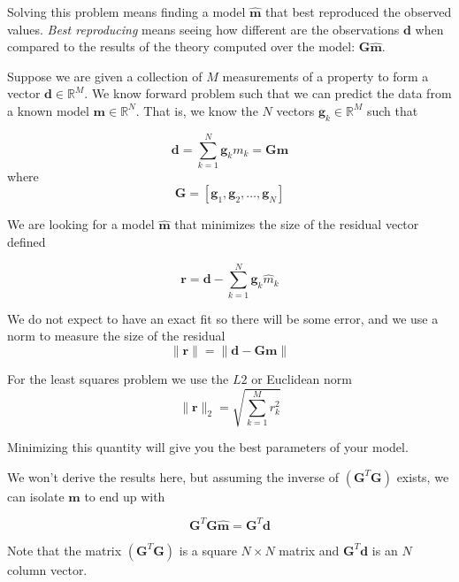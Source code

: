 \documentclass{article}
\newcommand{\real}{\mathbb{R}}
\begin{document}
Solving this problem means finding a model $\mathbf{\hat{m}}$ that
best reproduced the observed values. \emph{Best reproducing} means
seeing how different are the observations $\mathbf{d}$ when compared
to the results of the theory computed over the model: $\mathbf{G}
\mathbf{\hat{m}}$. 

Suppose we are given a collection of $M$ measurements of a property to
form a vector $\mathbf{d} \in \real^M$. We know forward problem such
that we can predict the data from a known model $\mathbf{m} \in
\real^N$. That is, we know the $N$ vectors $\mathbf{g}_k \in \real^M$
such that   

\begin{equation}
\mathbf{d} = \sum_{k=1}^{N} \mathbf{g}_k m_k = \mathbf{G} \mathbf{m}
\end{equation}
where
\begin{equation}
\mathbf{G} = \left[ \mathbf{g}_1, \mathbf{g}_2, \dots, \mathbf{g}_N \right] 
\end{equation}

We are looking for a model $\hat{\mathbf{m}}$ that minimizes the size
of the residual vector defined 

\begin{equation}
\mathbf{r} = \mathbf{d} -  \sum_{k=1}^{N} \mathbf{g}_k \hat{m}_k
\end{equation}

We do not expect to have an exact fit so there will be some error, and
we use a norm to measure the size of the residual 
\begin{equation}
\| \mathbf{r} \| = \| \mathbf{d} - \mathbf{Gm} \|
\end{equation}

For the least squares problem we use the $L2$ or Euclidean norm 
\begin{equation}
\| \mathbf{r} \|_2 = \sqrt{\sum_{k=1}^M r^2_k}
\end{equation}

Minimizing this quantity will give you the best parameters of your model.


We won't derive the results here, but assuming the inverse of $(\mathbf{G}^T \mathbf{G})$ exists, we can isolate $\hat{\mathbf{m}}$ to end up with

\begin{equation}
\mathbf{G}^T \mathbf{G}\hat{\mathbf{m}} = \mathbf{G}^T \mathbf{d}   
\label{eq:mlsq}
\end{equation}

Note that the matrix ${(\mathbf{G}^T \mathbf{G})}$ is a square
$N\times N$ matrix and $\mathbf{G}^T\mathbf{d}$ is an $N$ column
vector.  
\end{document}
